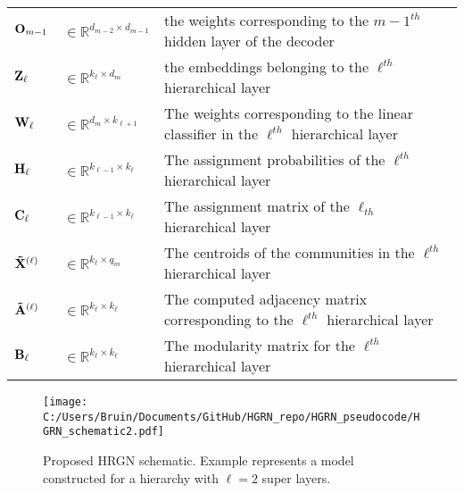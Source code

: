 \documentclass[a4paper,12pt]{article}
\begin{document}
\begin{table}[!ht]
\begin{tabular}{p{2cm}|p{3cm}|p{10cm}}
		${\bf O}_{m-1}$ & $\in \mathbb{R}^{d_{m-2}\times d_{m-1}}$ & the weights corresponding to the ${m-1}^{th}$ hidden layer of the decoder \\
		
		${\bf Z}_{\ell}$ & $\in\mathbb{R}^{k_\ell \times d_m}$ & the embeddings belonging to the $\ell^{th}$ hierarchical layer \\
		
		${\bf W}_\ell$ & $\in\mathbb{R}^{d_m \times k_{\ell + 1}}$ & The weights corresponding to the linear classifier in the $\ell^{th}$ hierarchical layer\\
		
		${\bf H}_\ell$ & $\in\mathbb{R}^{k_{\ell-1} \times k_\ell}$ & The assignment probabilities of the $\ell^{th}$ hierarchical layer \\
		
		${\bf C}_\ell$ & $\in\mathbb{R}^{k_{\ell-1} \times k_\ell}$ & The assignment matrix of the $\ell_{th}$ hierarchical layer \\
		
		${\bf \tilde X}^{(\ell)}$ & $\in\mathbb{R}^{k_\ell \times q_m}$& The centroids of the communities in the $\ell^{th}$ hierarchical layer \\
		
		${\bf \tilde A}^{(\ell)}$ & $\in\mathbb{R}^{k_\ell \times k_\ell}$& The computed adjacency matrix corresponding to the $\ell^{th}$ hierarchical layer \\
		
		${\bf B}_\ell$ & $\in\mathbb{R}^{k_\ell \times k_\ell}$ & The modularity matrix for the $\ell^{th}$ hierarchical layer \\
		
		\bottomrule[0.08cm]
	\end{tabular}
\end{table}

\newpage

\begin{figure}
	\caption{Proposed HRGN schematic. Example represents a model constructed for a hierarchy with $\ell = 2$ super layers.}
	\texttt{[image: C:/Users/Bruin/Documents/GitHub/HGRN\_repo/HGRN\_pseudocode/HGRN\_schematic2.pdf]}
\end{figure}
	
	
	
	
	
	
	
	
	
	
	
	
	
	
	
	
	
	
	
	
	
	
	
	
	
	
	
	
	
	
	
	
	
	
	
	\clearpage
	\newpage
	
	
	
	
	
	
	
	
	
\end{document}
